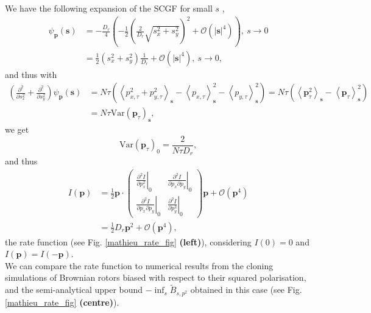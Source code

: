 \documentclass[pre,aps,superscriptaddress,nofootinbib]{revtex4}
\begin{document}
We have the following expansion of the SCGF for small $s$ \cite{abramowitz1948handbook},
\begin{equation}
\begin{aligned}
\psi_{\bm{p}}(\bm{s}) &= - \frac{D_r}{4} \left(-\frac{1}{2} \left(\frac{2}{D_r} \sqrt{s_x^2 + s_y^2}\right)^2 + \mathcal{O}(|\bm{s}|^4)\right),~ s \to 0\\
&= \frac{1}{2} (s_x^2 + s_y^2) \frac{1}{D_r} + \mathcal{O}(|\bm{s}|^4) ,~ s \to 0,
\end{aligned}
\end{equation}
and thus with
\begin{equation}
\begin{aligned}
\left(\frac{\partial^2}{\partial s_x^2} + \frac{\partial^2}{\partial s_y^2}\right) \psi_{\bm{p}}(\bm{s}) &= N \tau \left(\left<p_{x,\tau}^2 + p_{y,\tau}^2\right>_{\bm{s}} - \left<p_{x,\tau}\right>^2_{\bm{s}} - \left<p_{y,\tau}\right>^2_{\bm{s}}\right) = N \tau \left(\left<\bm{p}_{\tau}^2\right>_{\bm{s}} - \left<\bm{p}_{\tau}\right>^2_{\bm{s}}\right)\\
&= N \tau \mathrm{Var}(\bm{p}_{\tau})_{\bm{s}},
\end{aligned}
\end{equation}
we get
\begin{equation}
\mathrm{Var}(\bm{p}_{\tau})_0 = \frac{2}{N \tau D_r},
\end{equation}
and thus
\begin{equation}
\begin{aligned}
I(\bm{p}) &= \frac{1}{2} \bm{p} \cdot \begin{pmatrix} \left. \frac{\partial^2 I}{\partial p_x^2} \right|_0 & \left. \frac{\partial^2 I}{\partial p_x \partial p_y}  \right|_0 \\ \left. \frac{\partial^2 I}{\partial p_x \partial p_y}  \right|_0 & \left. \frac{\partial^2 I}{\partial p_y^2} \right|_0 \end{pmatrix} \bm{p} + \mathcal{O}(\bm{p}^4)\\
&= \frac{1}{2} D_r \bm{p}^2 + \mathcal{O}(\bm{p}^4),
\end{aligned}
\end{equation}
the rate function (see Fig. \ref{mathieu_rate_fig} \textbf{(left)}), considering $I(0) = 0$ and $I(\bm{p}) = I(-\bm{p})$.\\

We can compare the rate function to numerical results from the cloning simulations of Brownian rotors biased with respect to their squared polarisation, and the semi-analytical upper bound $-\inf_s \tilde{B}_{s,p^2}$ obtained in this case \cite{brownian_rotors_ldp} (see Fig. \ref{mathieu_rate_fig} \textbf{(centre)}).
\end{document}
